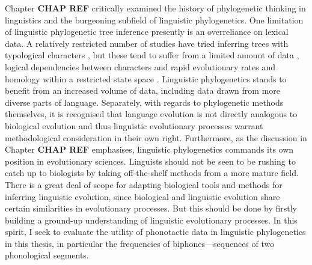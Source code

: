 Chapter \textbf{CHAP REF} critically examined the history of phylogenetic thinking in linguistics and the burgeoning subfield of linguistic phylogenetics. One limitation of linguistic phylogenetic tree inference presently is an overreliance on lexical data. A relatively restricted number of studies have tried inferring trees with typological characters \autocite[e.g.][]{sicoli_linguistic_2014}, but these tend to suffer from a limited amount of data \autocite{yanovich_phylogenetic_2020}, logical dependencies between characters \autocite{yanovich_phylogenetic_2020} and rapid evolutionary rates and homology within a restricted state space \autocite{greenhill_evolutionary_2017}. Linguistic phylogenetics stands to benefit from an increased volume of data, including data drawn from more diverse parts of language. Separately, with regards to phylogenetic methods themselves, it is recognised that language evolution is not directly analogous to biological evolution and thus linguistic evolutionary processes warrant methodological consideration in their own right. Furthermore, as the discussion in Chapter \textbf{CHAP REF} emphasises, linguistic phylogenetics commands its own position in evolutionary sciences. Linguists should not be seen to be rushing to catch up to biologists by taking off-the-shelf methods from a more mature field. There is a great deal of scope for adapting biological tools and methods for inferring linguistic evolution, since biological and linguistic evolution share certain similarities in evolutionary processes. But this should be done by firstly building a ground-up understanding of linguistic evolutionary processes. In this spirit, I seek to evaluate the utility of phonotactic data in linguistic phylogenetics in this thesis, in particular the frequencies of biphones---sequences of two phonological segments.

